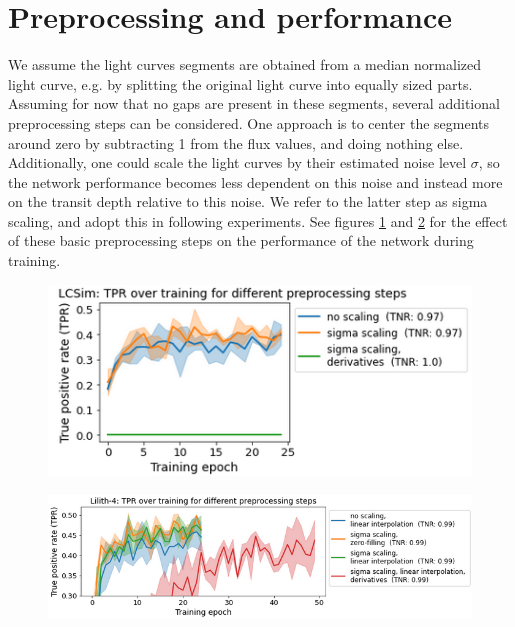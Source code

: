 
\section{Preprocessing and performance}

We assume the light curves segments are obtained from a median normalized light curve, e.g. by splitting the original light curve into equally sized parts. Assuming for now that no gaps are present in these segments, several additional preprocessing steps can be considered. One approach is to center the segments around zero by subtracting 1 from the flux values, and doing nothing else. Additionally, one could scale the light curves by their estimated noise level $\sigma$, so the network performance becomes less dependent on this noise and instead more on the transit depth relative to this noise. We refer to the latter step as sigma scaling, and adopt this in following experiments.  See figures \ref{fig:preprocessing-scaling_lcsim} and \ref{fig:preprocessing-scaling_lilith} for the effect of these basic preprocessing steps on the performance of the network during training. 

\begin{figure}
    \centering
    \includegraphics[width=0.5\linewidth]{Experiments/Figures/Preprocessing/preprocessing_lcsim_valid.png}
    \caption{}
    \label{fig:preprocessing-scaling_lcsim}
\end{figure}

\begin{figure}
    \centering
    \includegraphics[width=0.75\linewidth]{Experiments/Figures/Preprocessing/preprocessing_lilith_valid_2.png}
    \caption{}
    \label{fig:preprocessing-scaling_lilith}
\end{figure}

